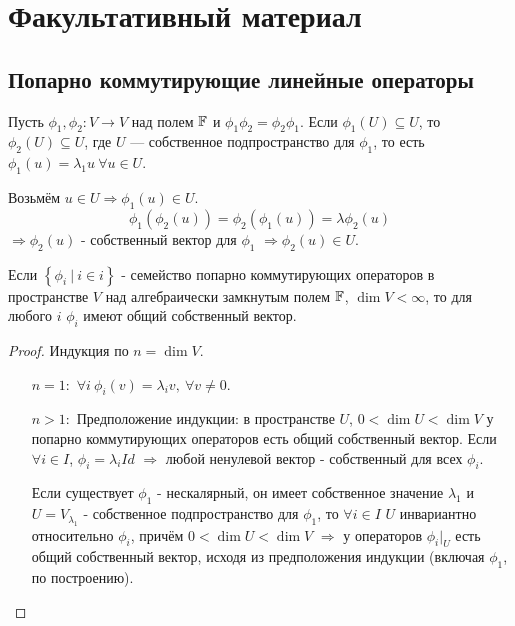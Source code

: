 
\section{Факультативный материал}
\subsection{Попарно коммутирующие линейные операторы}
Пусть $\phi_1, \phi_2: V \to V$ над полем $\mathbb{F}$ и $\phi_1 \phi_2 = \phi_2 \phi_1$. Если $\phi_1(U) \subseteq U$, то $\phi_2(U) \subseteq U$, где $U$ — собственное подпространство для $\phi_1$, то есть $\phi_1(u) = \lambda_1 u \ \forall u \in U$.

Возьмём $u \in U \Longrightarrow \phi_1(u) \in U$.
\[\phi_1(\phi_2(u)) = \phi_2(\phi_1(u)) = \lambda \phi_2(u)\]
$\Longrightarrow \phi_2(u)$ - собственный вектор для $\phi_1$ $\Longrightarrow \phi_2(u) \in U$.

\begin{theorem}
    Если $\left\{\phi_i \ | \ i \in i\right\}$ - семейство попарно коммутирующих операторов в пространстве $V$ над алгебраически замкнутым полем $\mathbb{F}$, $\dim{V} < \infty$, то для любого $i$ $\phi_i$ имеют общий собственный вектор.
\end{theorem} 
\begin{proof}
    Индукция по $n = \dim{V}$.
    \begin{itemize}
        \item[ $n = 1:$ ] $\forall i \ \phi_i(v) = \lambda_i v, \ \forall v \neq 0.$
        \item[ $n > 1:$ ] Предположение индукции: в пространстве $U$, $0 < \dim{U} < \dim{V}$ у попарно коммутирующих операторов есть общий собственный вектор. Если $\forall i \in I$, $\phi_i = \lambda_i Id$ $\Longrightarrow$ любой ненулевой вектор - собственный для всех $\phi_i$.

        Если существует $\phi_1$ - нескалярный, он имеет собственное значение $\lambda_1$ и $U = V_{\lambda_1}$ - собственное подпространство для $\phi_1$, то $\forall i \in I$ $U$ инвариантно относительно $\phi_i$, причём $0 < \dim{U} < \dim{V}$ $\Longrightarrow$ у операторов $\phi_i |_U$ есть общий собственный вектор, исходя из предположения индукции (включая $\phi_1$, по построению).
    \end{itemize}
\end{proof} 

